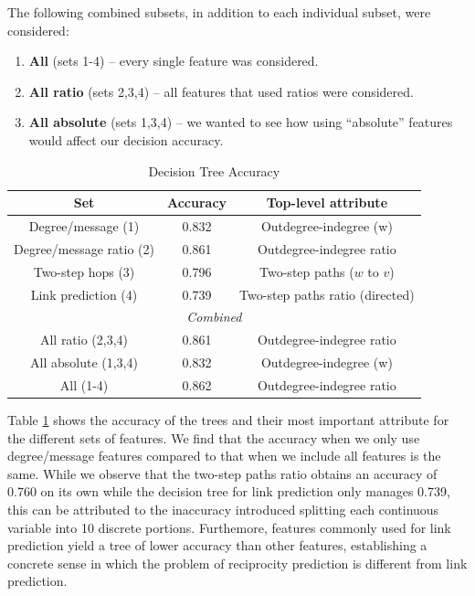 \documentclass[conference]{IEEEtran}
\begin{document}
The following combined subsets, in addition to each individual subset, were considered:
\begin{enumerate}
	\item {\bf All} (sets 1-4) -- every single feature was considered.
	\item {\bf All ratio} (sets 2,3,4) -- all features that used ratios were considered.
	\item {\bf All absolute} (sets 1,3,4) -- we wanted to see how using ``absolute'' features would affect our decision accuracy.
\end{enumerate}
\begin{table}[!t]
\renewcommand{\arraystretch}{1.3}
\caption{Decision Tree Accuracy}
\label{table_recresults_dtree}
\centering
\begin{tabular}{|c||c|c|}
\hline
\bf{Set} & Accuracy & Top-level attribute \\
\hline
Degree/message (1) & 0.832 & Outdegree-indegree (w) \\
Degree/message ratio (2) & 0.861 & Outdegree-indegree ratio \\
Two-step hops (3) & 0.796 & Two-step paths ($w$ to $v$) \\
Link prediction (4) & 0.739 & Two-step paths ratio (directed) \\
\hline
\multicolumn{3}{|c|}{\emph{Combined}} \\
\hline
All ratio (2,3,4) & 0.861 & Outdegree-indegree ratio \\
All absolute (1,3,4) & 0.832 & Outdegree-indegree (w) \\
All (1-4) & 0.862 & Outdegree-indegree ratio \\
\hline
\end{tabular}
\end{table}

Table \ref{table_recresults_dtree} shows the accuracy of the trees and
their most important attribute for the different sets of features. We
find that the accuracy when we only use degree/message features
compared to that when we include all features is the same. While we observe that the two-step paths ratio obtains an accuracy
of 0.760 on its own while the decision tree for link prediction only
manages 0.739, this can be attributed to the inaccuracy introduced
splitting each continuous variable into 10 discrete portions.
Furthemore, features commonly used for
link prediction yield a tree of lower accuracy than other features, establishing a concrete sense in which 
the problem of reciprocity prediction is different
from link prediction.
\end{document}
